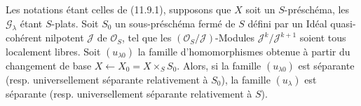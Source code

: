 
\begin{proposition}[11.9.15]
\label{IV.11.9.15-fr}
Les notations étant celles de (11.9.1), supposons que $X$ soit un
$S$-préschéma, les $\mathcal G_\lambda$ étant $S$-plats. Soit $S_0$ un
sous-préschéma fermé de $S$ défini par un Idéal quasi-cohérent nilpotent
$\mathcal J$ de $\mathcal O_S$, tel que les
$(\mathcal O_S/\mathcal J)$-Modules $\mathcal J^k/\mathcal J^{k+1}$ soient
tous localement libres. Soit $(u_{\lambda0})$ la famille d'homomorphismes
obtenue à partir du changement de base
$X\leftarrow X_0=X\times_S S_0$. Alors, si la famille $(u_{\lambda0})$ est
séparante (resp. universellement séparante relativement à $S_0$), la famille
$(u_\lambda)$ est séparante (resp. universellement séparante relativement à
$S$).
\end{proposition}

